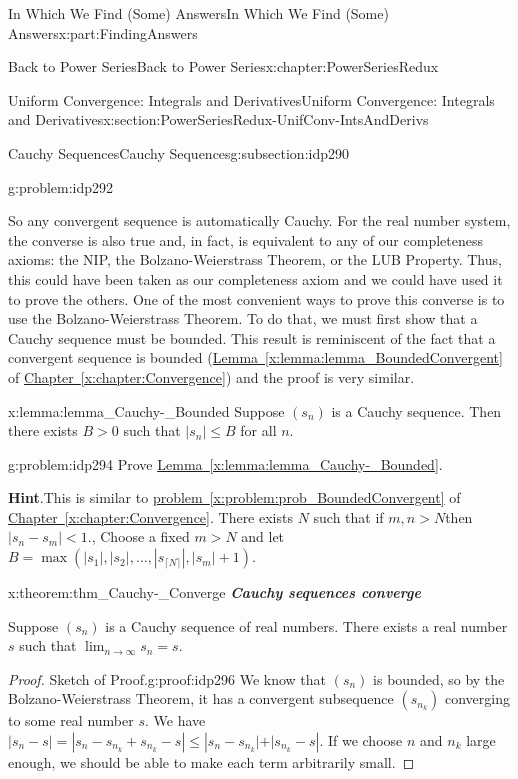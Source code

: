 \documentclass[oneside,10pt,]{book}
\newcommand{\blocktitlefont}{\relax}
\newcommand{\xreffont}{\relax}
\newcommand{\alert}[1]{\textbf{\textit{#1}}}
\numberwithin{equation}{section}
\newcommand{\abs}[1]{\left|#1\right|}
\newcommand{\lt}{<}
\begin{document}
\begin{partptx}{In Which We Find (Some) Answers}{}{In Which We Find (Some) Answers}{}{}{x:part:FindingAnswers}
\begin{chapterptx}{Back to Power Series}{}{Back to Power Series}{}{}{x:chapter:PowerSeriesRedux}
\begin{sectionptx}{Uniform Convergence: Integrals and Derivatives}{}{Uniform Convergence: Integrals and Derivatives}{}{}{x:section:PowerSeriesRedux-UnifConv-IntsAndDerivs}
\begin{subsectionptx}{Cauchy Sequences}{}{Cauchy Sequences}{}{}{g:subsection:idp290}
\begin{problem}{}{g:problem:idp292}
\end{problem}
So any convergent sequence is automatically Cauchy. For the real number system, the converse is also true and, in fact, is equivalent to any of our completeness axioms: the NIP, the Bolzano-Weierstrass Theorem, or the LUB Property. Thus, this could have been taken as our completeness axiom and we could have used it to prove the others. One of the most convenient ways to prove this converse is to use the Bolzano-Weierstrass Theorem. To do that, we must first show that a Cauchy sequence must be bounded. This result is reminiscent of the fact that a convergent sequence is bounded (\hyperref[x:lemma:lemma_BoundedConvergent]{Lemma~{\xreffont\ref{x:lemma:lemma_BoundedConvergent}}} of \hyperref[x:chapter:Convergence]{Chapter~{\xreffont\ref{x:chapter:Convergence}}}) and the proof is very similar.%
\begin{lemma}{}{}{x:lemma:lemma_Cauchy-_Bounded}%
Suppose \(\left(s_n\right)\) \(\)is a Cauchy sequence. Then there exists \(B>0\) such that \(|s_n|\leq B\) for all \(n\).%
\end{lemma}
\begin{problem}{}{g:problem:idp294}%
Prove \hyperref[x:lemma:lemma_Cauchy-_Bounded]{Lemma~{\xreffont\ref{x:lemma:lemma_Cauchy-_Bounded}}}.%
\par\smallskip%
\noindent\textbf{\blocktitlefont Hint}.\hypertarget{g:hint:idp295}{}\quad{}This is similar to \hyperref[x:problem:prob_BoundedConvergent]{problem~{\xreffont\ref{x:problem:prob_BoundedConvergent}}} of \hyperref[x:chapter:Convergence]{Chapter~{\xreffont\ref{x:chapter:Convergence}}}. There exists \(N\) such that if \(m,n>N\)then \(|s_n-s_m|\lt 1.\), Choose a fixed \(m>N\) and let \(B=\max\left(\abs{s_1}, \abs{s_2}, \ldots, \abs{s_{\lceil N\rceil}}, \abs{s_m}+1\right)\).%
\end{problem}
\begin{theorem}{}{}{x:theorem:thm_Cauchy-_Converge}%
\alert{Cauchy sequences converge}%
\par
{} Suppose \(\left(s_n\right)\) is a Cauchy sequence of real numbers. There exists a real number \(s\) such that \(\lim_{n\rightarrow\infty}s_n=s\).%
\end{theorem}
\begin{proof}{Sketch of Proof.}{g:proof:idp296}
We know that \(\left(s_n\right)\) \(\)is bounded, so by the Bolzano-Weierstrass Theorem, it has a convergent subsequence \(\left(s_{n_k}\right)\) converging to some real number \(s\). We have \(|s_n-s|=|s_n-s_{n_k}+s_{n_k}-s|\leq|s_n-s_{n_k}\mathopen|+|s_{n_k}-s|\). If we choose \(n\) and \(n_k\) large enough, we should be able to make each term arbitrarily small.%

\end{proof}
\end{subsectionptx}
\end{sectionptx}
\end{chapterptx}
\end{partptx}
\end{document}
